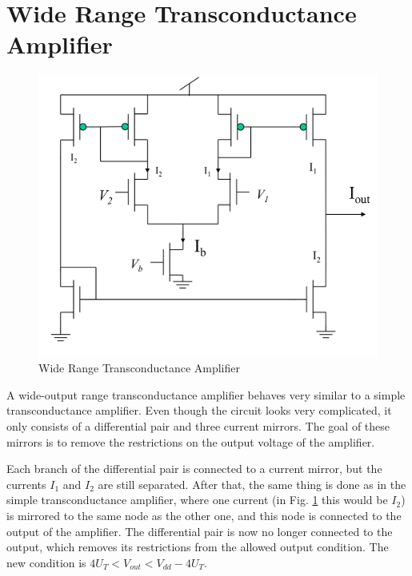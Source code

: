 \documentclass[main]{subfiles}
\begin{document}

\section{Wide Range Transconductance Amplifier}

\begin{figure}[htbp]
  \centering
  \includegraphics[scale=0.5]{figs/wide_range_transamp.png}
  \caption{Wide Range Transconductance Amplifier \cite{lec4}}
  \label{fig:wr_Transamp}
\end{figure}\bigskip


A wide-output range transconductance amplifier behaves very similar to a simple transconductance amplifier. Even though the circuit looks very complicated, it only consists of a differential pair and three current mirrors. The goal of these mirrors is to remove the restrictions on the output voltage of the amplifier.
\par Each branch of the differential pair is connected to a current mirror, but the currents $I_1$ and $I_2$ are still separated. After that, the same thing is done as in the simple transconductance amplifier, where one current (in Fig. \ref{fig:wr_Transamp} this would be $I_2$) is mirrored to the same node as the other one, and this node is connected to the output of the amplifier. The differential pair is now no longer connected to the output, which removes its restrictions from the allowed output condition. The new condition is
\( 4U_T < V_{out} < V_{dd} -4U_T\).
\end{document}
